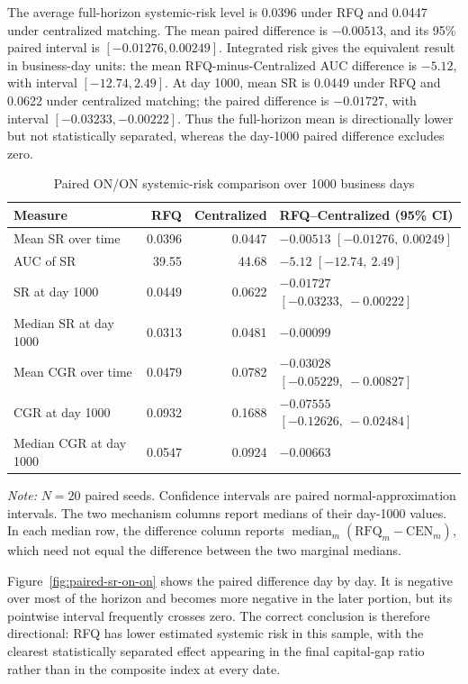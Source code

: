 The average full-horizon systemic-risk level is 0.0396 under RFQ and
0.0447 under centralized matching. The mean paired difference is
\(-0.00513\), and its 95\% paired interval is
\([-0.01276,0.00249]\). Integrated risk gives the equivalent result in
business-day units: the mean RFQ-minus-Centralized AUC difference is
\(-5.12\), with interval \([-12.74,2.49]\). At day 1000, mean SR is
0.0449 under RFQ and 0.0622 under centralized matching; the paired
difference is \(-0.01727\), with interval \([-0.03233,-0.00222]\).
Thus the full-horizon mean is directionally lower but not statistically
separated, whereas the day-1000 paired difference excludes zero.

\begin{table}[htbp]
\centering
\caption{Paired ON/ON systemic-risk comparison over 1000 business days}
\label{tab:paired-baseline-risk}
\scriptsize
\begin{tabularx}{\textwidth}{@{}>{\raggedright\arraybackslash}Xrr>{\raggedleft\arraybackslash}p{}@{}}
\toprule
\textbf{Measure} & \textbf{RFQ} & \textbf{Centralized} & \textbf{RFQ--Centralized (95\% CI)}\\
\midrule
Mean SR over time & 0.0396 & 0.0447 & $-0.00513$ $[-0.01276,\ 0.00249]$\\
AUC of SR & 39.55 & 44.68 & $-5.12$ $[-12.74,\ 2.49]$\\
SR at day 1000 & 0.0449 & 0.0622 & $-0.01727$ $[-0.03233,\ -0.00222]$\\
Median SR at day 1000 & 0.0313 & 0.0481 & $-0.00099$\\
Mean CGR over time & 0.0479 & 0.0782 & $-0.03028$ $[-0.05229,\ -0.00827]$\\
CGR at day 1000 & 0.0932 & 0.1688 & $-0.07555$ $[-0.12626,\ -0.02484]$\\
Median CGR at day 1000 & 0.0547 & 0.0924 & $-0.00663$\\
\bottomrule
\end{tabularx}
\begin{minipage}{0.96\textwidth}
\footnotesize
\textit{Note:} \(N=20\) paired seeds. Confidence intervals are paired
normal-approximation intervals. The two mechanism columns report
medians of their day-1000 values. In each median row, the difference column
reports \(\operatorname{median}_m(\mathrm{RFQ}_m-\mathrm{CEN}_m)\),
which need not equal the difference between the two marginal medians.
\end{minipage}
\end{table}

Figure~\ref{fig:paired-sr-on-on} shows the paired difference day by day.
It is negative over most of the horizon and becomes more negative in the
later portion, but its pointwise interval frequently crosses zero. The
correct conclusion is therefore directional: RFQ has lower estimated
systemic risk in this sample, with the clearest statistically separated
effect appearing in the final capital-gap ratio rather than in the
composite index at every date.

